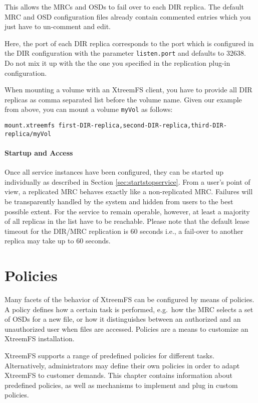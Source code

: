 \documentclass[a4paper,10pt]{book}
\begin{document}
This allows the MRCs and OSDs to fail over to each DIR replica. The default MRC and OSD configuration files already contain commented entries which you just have to un-comment and edit.

Here, the port of each DIR replica corresponds to the port which is configured in the DIR configuration with the parameter \texttt{listen.port} and defaults to 32638. Do not mix it up with the the one you specified in the replication plug-in configuration.

When mounting a volume with an XtreemFS client, you have to provide all DIR replicas as comma separated list before the volume name. Given our example from above, you can mount a volume \texttt{myVol} as follows:

\begin{verbatim}
mount.xtreemfs first-DIR-replica,second-DIR-replica,third-DIR-replica/myVol
\end{verbatim}

\subsubsection{Startup and Access}
Once all service instances have been configured, they can be started up individually as described in Section \ref{sec:startstopservice}. From a user's point of view, a replicated MRC behaves exactly like a non-replicated MRC. Failures will be transparently handled by the system and hidden from users to the best possible extent. For the service to remain operable, however, at least a majority of all replicas in the list have to be reachable. Please note that the default lease timeout for the DIR/MRC replication is 60 seconds i.e., a fail-over to another replica may take up to 60 seconds.


\chapter{Policies} \label{chap:policies}
Many facets of the behavior of XtreemFS can be configured by means of policies. A policy defines how a certain task is performed, e.g.\ how the MRC selects a set of OSDs for a new file, or how it distinguishes between an authorized and an unauthorized user when files are accessed. Policies are a means to customize an XtreemFS installation.

XtreemFS supports a range of predefined policies for different tasks. Alternatively, administrators may define their own policies in order to adapt XtreemFS to customer demands. This chapter contains information about predefined policies, as well as mechanisms to implement and plug in custom policies.
\end{document}
